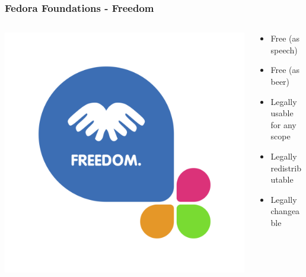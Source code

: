\documentclass[t,aspectratio=169]{beamer}
\begin{document}
\begin{frame}
    \frametitle{Fedora Foundations - Freedom}
    \begin{columns}[T] %
        \begin{column}{.5\textwidth}
            \includegraphics[width=\linewidth]{foundations_expand_1_freedom.png}
        \end{column}
        \begin{column}{.5\textwidth}
            \begin{itemize}
                \item<2-> Free (as speech)
                \item<3-> Free (as beer)
                \item<4-> Legally usable for any scope
                \item<5-> Legally redistributable
                \item<6-> Legally changeable
            \end{itemize}
        \end{column}
    \end{columns}
\end{frame}
\end{document}
